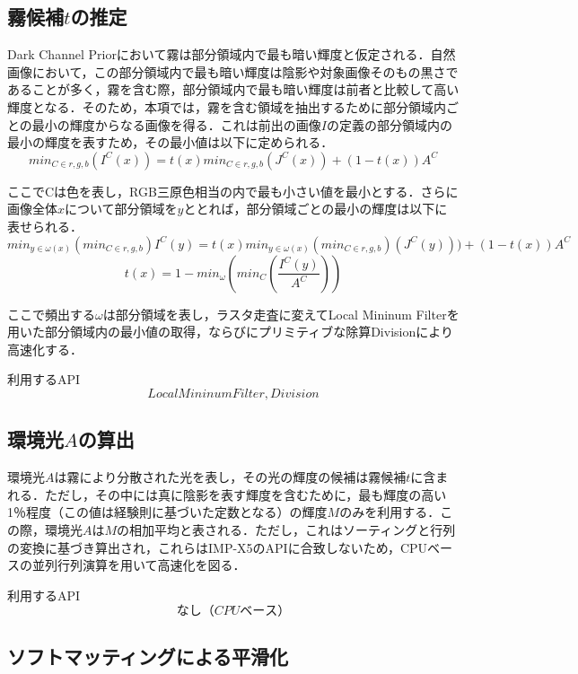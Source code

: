 \documentclass{jsarticle}
\begin{document}
\subsection{霧候補$t$の推定}
\label{霧候補$t$の推定}

Dark Channel Priorにおいて霧は部分領域内で最も暗い輝度と仮定される．自然画像において，この部分領域内で最も暗い輝度は陰影や対象画像そのもの黒さであることが多く，霧を含む際，部分領域内で最も暗い輝度は前者と比較して高い輝度となる．そのため，本項では，霧を含む領域を抽出するために部分領域内ごとの最小の輝度からなる画像を得る．これは前出の画像$I$の定義の部分領域内の最小の輝度を表すため，その最小値は以下に定められる．
\[
min_{C\in{r,g,b}}(I^C(x)) = t(x) min_{C\in{r,g,b}}(J^C(x)) + (1-t(x))A^C
\]

ここでCは色を表し，RGB三原色相当の内で最も小さい値を最小とする．さらに画像全体$x$について部分領域を$y$ととれば，部分領域ごとの最小の輝度は以下に表せられる．
\[
min_{y \in \omega(x)} (min_{C \in{r,g,b}}) I^C(y) = t(x) min_{y \in \omega(x)}(min_{C \in{r,g,b}})(J^C(y))) + (1-t(x))A^C
\]
\[
t(x)=1-min_{\omega} (min_{C}(\frac{I^C(y)}{A^C}))
\]

ここで頻出する$\omega$は部分領域を表し，ラスタ走査に変えてLocal Mininum Filterを用いた部分領域内の最小値の取得，ならびにプリミティブな除算Divisionにより高速化する．

\begin{itembox}[l]{利用するAPI}
\[
Local Mininum Filter, Division
\]
\end{itembox}

\subsection{環境光$A$の算出}
\label{環境光$A$の算出}

環境光$A$は霧により分散された光を表し，その光の輝度の候補は霧候補$t$に含まれる．ただし，その中には真に陰影を表す輝度を含むために，最も輝度の高い1％程度（この値は経験則に基づいた定数となる）の輝度$M$のみを利用する．この際，環境光$A$は$M$の相加平均と表される．ただし，これはソーティングと行列の変換に基づき算出され，これらはIMP-X5のAPIに合致しないため，CPUベースの並列行列演算を用いて高速化を図る．

\begin{itembox}[l]{利用するAPI}
\[
なし（CPUベース）
\]
\end{itembox}

\subsection{ソフトマッティングによる平滑化}
\label{ソフトマッティングによる平滑化}
\end{document}
